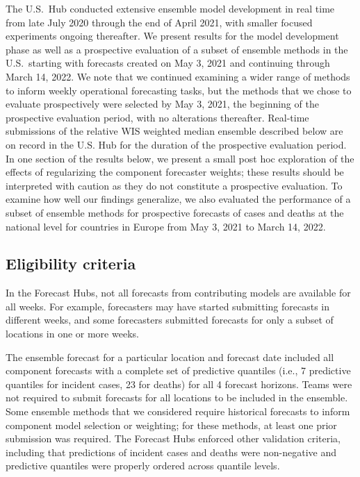 \documentclass[11pt,3p,authoryear]{elsarticle}
\begin{document}
The U.S.\ Hub conducted extensive ensemble model development in real time from late July 2020 through the end of April 2021, with smaller focused experiments ongoing thereafter. We present results for the model development phase as well as a prospective evaluation of a subset of ensemble methods in the U.S.\ starting with forecasts created on May 3, 2021 and continuing through March 14, 2022. We note that we continued examining a wider range of methods to inform weekly operational forecasting tasks, but the methods that we chose to evaluate prospectively were selected by May 3, 2021, the beginning of the prospective evaluation period, with no alterations thereafter. Real-time submissions of the relative WIS weighted median ensemble described below are on record in the U.S. Hub for the duration of the prospective evaluation period. In one section of the results below, we present a small post hoc exploration of the effects of regularizing the component forecaster weights; these results should be interpreted with caution as they do not constitute a prospective evaluation. To examine how well our findings generalize, we also evaluated the performance of a subset of ensemble methods for prospective forecasts of cases and deaths at the national level for countries in Europe from May 3, 2021 to March 14, 2022.

\subsection{Eligibility criteria}
\label{subsec:methods_eligibility}

In the Forecast Hubs, not all forecasts from contributing models are available for all weeks. For example, forecasters may have started submitting forecasts in different weeks, and some forecasters submitted forecasts for only a subset of locations in one or more weeks.

The ensemble forecast for a particular location and forecast date included all component forecasts with a complete set of predictive quantiles (i.e., 7 predictive quantiles for incident cases, 23 for deaths) for all 4 forecast horizons. Teams were not required to submit forecasts for all locations to be included in the ensemble. Some ensemble methods that we considered require historical forecasts to inform component model selection or weighting; for these methods, at least one prior submission was required. The Forecast Hubs enforced other validation criteria, including that predictions of incident cases and deaths were non-negative and predictive quantiles were properly ordered across quantile levels.
\end{document}
